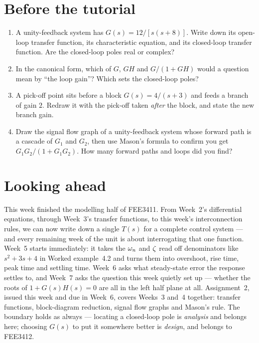\documentclass[11pt,a4paper]{article}
\begin{document}
\section*{Before the tutorial}

\begin{enumerate}
\item A unity-feedback system has $G(s)=12/[s(s+8)]$. Write down its open-loop
      transfer function, its characteristic equation, and its closed-loop
      transfer function. Are the closed-loop poles real or complex?
\item In the canonical form, which of $G$, $GH$ and $G/(1+GH)$ would a question
      mean by ``the loop gain''? Which sets the closed-loop poles?
\item A pick-off point sits before a block $G(s)=4/(s+3)$ and feeds a branch of
      gain $2$. Redraw it with the pick-off taken \emph{after} the block, and
      state the new branch gain.
\item Draw the signal flow graph of a unity-feedback system whose forward path
      is a cascade of $G_1$ and $G_2$, then use Mason's formula to confirm you
      get $G_1G_2/(1+G_1G_2)$. How many forward paths and loops did you find?
\end{enumerate}

\section*{Looking ahead}

This week finished the modelling half of FEE3411. From Week~2's differential
equations, through Week~3's transfer functions, to this week's interconnection
rules, we can now write down a single $T(s)$ for a complete control system ---
and every remaining week of the unit is about interrogating that one function.
Week~5 starts immediately: it takes the $\omega_{n}$ and $\zeta$ read off denominators
like $s^{2}+3s+4$ in Worked example~4.2 and turns them into overshoot, rise
time, peak time and settling time. Week~6 asks what steady-state error the
response settles to, and Week~7 asks the question this week quietly set up ---
whether the roots of $1+G(s)H(s)=0$ are all in the left half plane at all.
Assignment~2, issued this week and due in Week~6, covers Weeks~3 and~4
together: transfer functions, block-diagram reduction, signal flow graphs and
Mason's rule. The boundary holds as always --- locating a closed-loop pole is
\emph{analysis} and belongs here; choosing $G(s)$ to put it somewhere better
is \emph{design}, and belongs to FEE3412.
\end{document}
